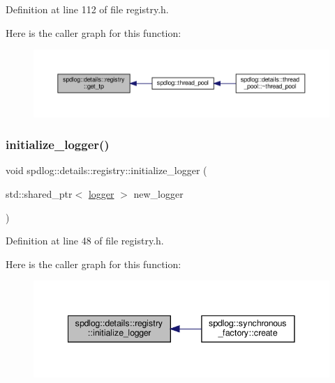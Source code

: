 Definition at line 112 of file registry.\+h.

Here is the caller graph for this function\+:
\nopagebreak
\begin{figure}[H]
\begin{center}
\leavevmode
\includegraphics[width=350pt]{classspdlog_1_1details_1_1registry_af86cd2fcbec489ebc343815f49a6e076_icgraph}
\end{center}
\end{figure}
\mbox{\label{classspdlog_1_1details_1_1registry_a7e015c41e9c32c9f1e8e7f9adc578cee}} 
\subsubsection{\texorpdfstring{initialize\+\_\+logger()}{initialize\_logger()}}
{\footnotesize\ttfamily void spdlog\+::details\+::registry\+::initialize\+\_\+logger (\begin{DoxyParamCaption}\item[{std\+::shared\+\_\+ptr$<$ \hyperlink{classspdlog_1_1logger}{logger} $>$}]{new\+\_\+logger }\end{DoxyParamCaption})\hspace{0.3cm}{\ttfamily [inline]}}



Definition at line 48 of file registry.\+h.

Here is the caller graph for this function\+:
\nopagebreak
\begin{figure}[H]
\begin{center}
\leavevmode
\includegraphics[width=341pt]{classspdlog_1_1details_1_1registry_a7e015c41e9c32c9f1e8e7f9adc578cee_icgraph}
\end{center}
\end{figure}
\mbox{\label{classspdlog_1_1details_1_1registry_a58a1bbb352f751f6b729bc57bfadd6be}} 
